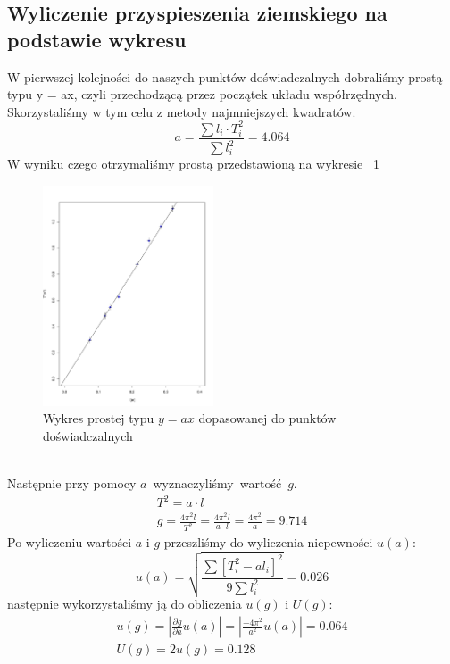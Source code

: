 \documentclass{fizraport}
\begin{document}
\subsection{Wyliczenie przyspieszenia ziemskiego na podstawie wykresu}
W pierwszej kolejności do naszych punktów doświadczalnych dobraliśmy prostą typu y = ax, czyli przechodzącą przez początek
układu współrzędnych. Skorzystaliśmy w tym celu z metody najmniejszych kwadratów.
\[ a = \frac{\sum{l_i \cdot T_i^2}}{\sum{l_i^2}}=4.064\]
W wyniku czego otrzymaliśmy prostą przedstawioną na wykresie~ \figurename{\ref{fig:w4}}
\begin{figure}[htbp]
 \centering
 \includegraphics[width=0.45\textwidth,keepaspectratio=true]{wykres4.pdf}
   \caption{Wykres prostej typu $y = ax$ dopasowanej do punktów doświadczalnych}
 \label{fig:w4}
\end{figure}
%
\\
Następnie przy pomocy $a$~wyznaczyliśmy~wartość~$g$.
 \begin{equation*}
    \begin{split}
        T^2=a \cdot l\\
        g=\frac{4\pi^2l}{T^2}=\frac{4\pi^2l}{a\cdot l}=\frac{4\pi^2}{a}=9.714
    \end{split}
\end{equation*}
Po wyliczeniu wartości $a$ i $g$ przeszliśmy do wyliczenia niepewności $u(a)$:
\[u(a)=\sqrt{\frac{\sum{[T^2_i-al_i]^2}}{9\sum{l_i^2}}}=0.026\]
 następnie wykorzystaliśmy ją do obliczenia $u(g)$ i $U(g)$:
 \begin{equation*}
    \begin{split}
     u(g) = \left| \frac{\partial g}{\partial a}u(a)\right|=\left| \frac{-4\pi^2}{a^2}u(a)\right|=0.064\\
     U(g)=2u(g)=0.128
    \end{split}
\end{equation*}
\end{document}
